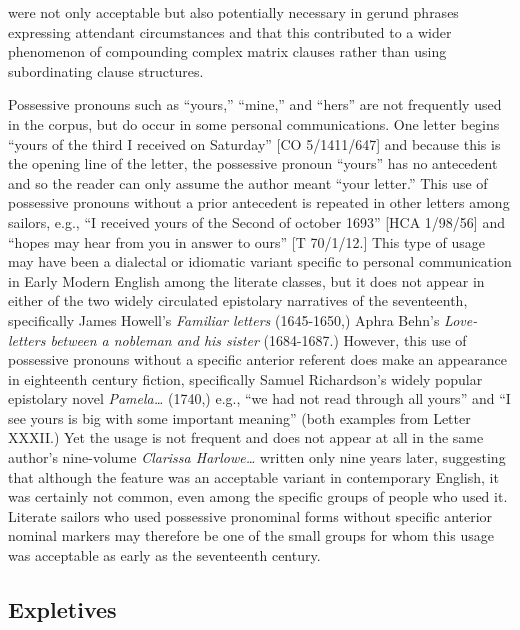 were not only acceptable but also potentially necessary in gerund phrases expressing attendant circumstances and that this contributed to a wider phenomenon of compounding complex matrix clauses rather than using subordinating clause structures.

  Possessive pronouns such as “yours,” “mine,” and “hers” are not frequently used in the corpus, but do occur in some personal communications. One letter begins “yours of the third I received on Saturday” [CO 5/1411/647] and because this is the opening line of the letter, the possessive pronoun “yours” has no antecedent and so the reader can only assume the author meant “your letter.” This use of possessive pronouns without a prior antecedent is repeated in other letters among sailors, e.g., “I received yours of the Second of october 1693” [HCA 1/98/56] and “hopes may hear from you in answer to ours” [T 70/1/12.] This type of usage may have been a dialectal or idiomatic variant specific to personal communication in Early Modern English among the literate classes, but it does not appear in either of the two widely circulated epistolary narratives of the seventeenth, specifically James Howell’s \textit{Familiar letters} (1645-1650,) Aphra Behn’s \textit{Love-letters between a nobleman and his sister} (1684-1687.) However, this use of possessive pronouns without a specific anterior referent does make an appearance in eighteenth century fiction, specifically Samuel Richardson’s widely popular epistolary novel \textit{Pamela…} (1740,) e.g., “we had not read through all yours” and “I see yours is big with some important meaning” (both examples from Letter XXXII.) Yet the usage is not frequent and does not appear at all in the same author’s nine-volume \textit{Clarissa Harlowe…} written only nine years later, suggesting that although the feature was an acceptable variant in contemporary English, it was certainly not common, even among the specific groups of people who used it. Literate sailors who used possessive pronominal forms without specific anterior nominal markers may therefore be one of the small groups for whom this usage was acceptable as early as the seventeenth century. 

\subsection{{Expletives}}%

